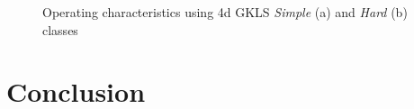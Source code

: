 \documentclass[runningheads]{llncs}
\begin{document}
\begin{figure}
\begin{minipage}{0.5\linewidth}
\end{minipage}
\begin{minipage}{0.5\linewidth}
\end{minipage}
\caption{Operating characteristics using 4d GKLS \textit{Simple} (a) and \textit{Hard} (b) classes}
\label{fig3}
\end{figure}


\section{Conclusion}
\end{document}
